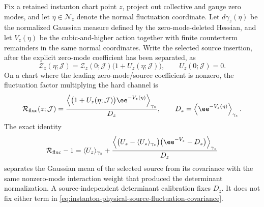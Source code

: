 \begin{controlledapproximation}
\label{ca:instanton-nonzero-mode-source-quotient}
Fix a retained instanton chart point \(z\), project out collective and gauge
zero modes, and let \(\eta\in\mathcal N_z\) denote the normal fluctuation
coordinate.  Let \(d\gamma_z(\eta)\) be the normalized Gaussian measure
defined by the zero-mode-deleted Hessian, and let
\(V_z(\eta)\) be the cubic-and-higher action together with finite counterterm
remainders in the same normal coordinates.  Write the selected source
insertion, after the explicit zero-mode coefficient has been separated, as
\[
  \mathcal Z_z(\eta;\mathcal J)
  =
  \mathcal Z_z(0;\mathcal J)
  \bigl(1+U_z(\eta;\mathcal J)\bigr),
  \qquad U_z(0;\mathcal J)=0 .
\]
On a chart where the leading zero-mode/source coefficient is nonzero, the
fluctuation factor multiplying the hard channel is
\begin{equation}
  \mathcal R_{\rm fluc}(z;\mathcal J)
  =
  \frac{
    \left\langle
      \bigl(1+U_z(\eta;\mathcal J)\bigr)
      \ee^{-V_z(\eta)}
    \right\rangle_{\gamma_z}
  }{
    D_z
  },
  \qquad
  D_z=\left\langle\ee^{-V_z(\eta)}\right\rangle_{\gamma_z}.
  \label{eq:instanton-physical-source-fluctuation-quotient}
\end{equation}
The exact identity
\begin{equation}
  \mathcal R_{\rm fluc}-1
  =
  \langle U_z\rangle_{\gamma_z}
  +
  \frac{
    \left\langle
    \bigl(U_z-\langle U_z\rangle_{\gamma_z}\bigr)
    \bigl(\ee^{-V_z}-D_z\bigr)
    \right\rangle_{\gamma_z}
  }{D_z}
  \label{eq:instanton-physical-source-fluctuation-covariance}
\end{equation}
separates the Gaussian mean of the selected source from its covariance with
the same nonzero-mode interaction weight that produced the determinant
normalization.  A source-independent determinant calibration fixes \(D_z\).
It does not fix either term in
\eqref{eq:instanton-physical-source-fluctuation-covariance}.


\end{controlledapproximation}
